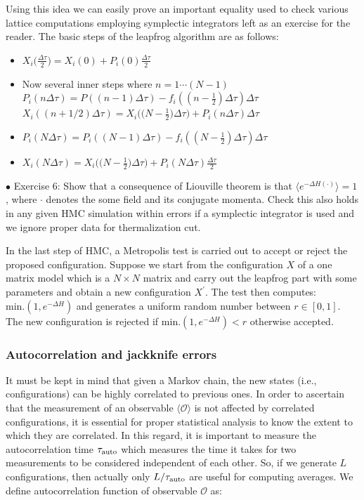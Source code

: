 \documentclass[11pt]{article}
\begin{document}
Using this idea we can easily prove an important equality used to check various lattice computations employing symplectic integrators left as an exercise for the reader. The basic steps of the leapfrog algorithm are as follows:
\begin{itemize}
	\item $X_{i}\big(\frac{\Delta \tau}{2}\big) = X_{i}(0) + P_{i}(0)\frac{\Delta \tau}{2}$
	\item Now several inner steps where $n =  1 \cdots (N-1)$
	\subitem $P_{i}(n \Delta \tau) = P((n-1) \Delta \tau) - f_{i}((n-\frac{1}{2}) \Delta \tau) \Delta \tau$ 
	\subitem $X_{i}((n + 1/2) \Delta \tau) = X_{i}\Big(\Big(N - \frac{1}{2}\Big) \Delta \tau\Big)  + P_{i}(n \Delta \tau) \Delta \tau$
	\item $P_{i}(N \Delta \tau) = P_{i}((N-1) \Delta \tau) - f_{i}((N-\frac{1}{2}) \Delta \tau) \Delta \tau$ 
	\item $X_{i}(N \Delta \tau) = X_{i}\Big(\Big(N - \frac{1}{2}\Big) \Delta \tau\Big) + P_{i}(N \Delta \tau) \frac{\Delta \tau}{2}$ 
\end{itemize} 
    \begin{mdframed}[backgroundcolor=blue!3] 
    \textsc{} 
    $\bullet$ Exercise 6: Show that a consequence of Liouville theorem is that $ \langle e^{-\Delta H(\boldsymbol{\cdot})} \rangle = 1$, where $\boldsymbol{\cdot}$ denotes the some field and its conjugate momenta. Check this also holds in any given HMC simulation within errors if a symplectic integrator is used and we ignore proper data for thermalization cut.
    \end{mdframed} 
In the last step of HMC, a Metropolis test is carried out to accept or reject the proposed
configuration. Suppose we start from the configuration $X$ of a one matrix model 
which is a $N \times N$ matrix and carry out the leapfrog part with some parameters and obtain a new configuration 
$X^{\prime}$. The test then computes: \texttt{$\text{min.}(1, e^{-\Delta H})$} and generates 
a uniform random number between $r \in [0,1]$. The new configuration is rejected if \texttt{$\text{min.}(1, e^{-\Delta H}) < r$} otherwise accepted. 


\subsubsection{Autocorrelation and jackknife errors} 

It must be kept in mind that given a Markov chain, the new states (i.e., configurations) can be highly correlated to previous ones. In order to ascertain that the measurement of an observable $\langle \mathcal{O} \rangle$ is not affected by correlated configurations, it is essential for proper statistical analysis to know the extent to which they are correlated. In this regard, it is important to measure
the autocorrelation time $ \tau_{\rm{auto}}$ which measures the time it takes for two measurements to be considered independent of each other. So, if we generate $L$ configurations, then actually only $L/\tau_{\rm{auto}}$ are useful for computing averages.
We define autocorrelation function of observable $\mathcal{O}$ as:
 
\end{document}

